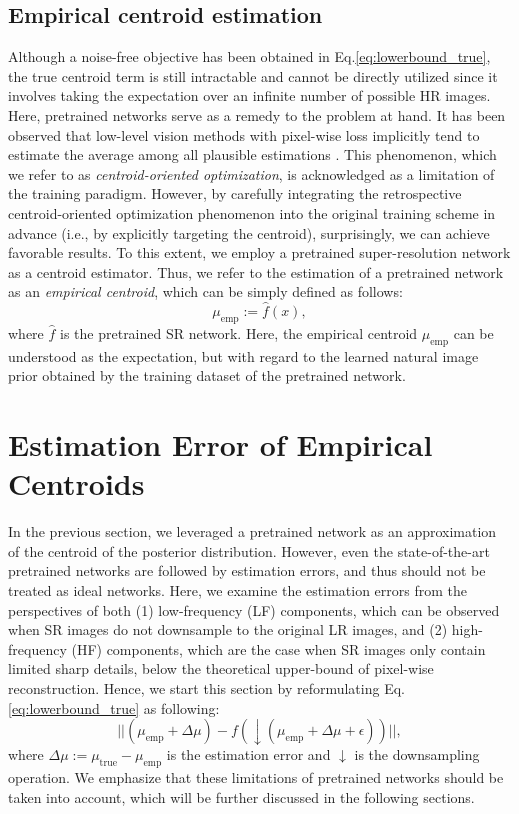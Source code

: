\documentclass[letterpaper]{article} %
\begin{document}
\subsection{Empirical centroid estimation}
Although a noise-free objective has been obtained in Eq.\eqref{eq:lowerbound_true}, the true centroid term is still intractable and cannot be directly utilized since it involves taking the expectation over an infinite number of possible HR images.
%
Here, pretrained networks serve as a remedy to the problem at hand. It has been observed that low-level vision methods with pixel-wise loss implicitly tend to estimate the average among all plausible estimations \cite{coo_1, coo_2, SISR6_SRGAN, SISR7_ESRGAN} . This phenomenon, which we refer to as \textit{centroid-oriented optimization}, is acknowledged as a limitation of the training paradigm.
%
However, by carefully integrating the retrospective centroid-oriented optimization phenomenon into the original training scheme in advance (i.e., by explicitly targeting the centroid), surprisingly, we can achieve favorable results.
%
To this extent, we employ a pretrained super-resolution network as a centroid estimator. Thus, we refer to the estimation of a pretrained network as an \textit{empirical centroid}, which can be simply defined as follows:
%
\begin{equation}
    \mu_{\text{emp}} := \hat{f}(x),
\end{equation}
%
where $\hat{f}$ is the pretrained SR network.
%
Here, the empirical centroid $\mu_{\text{emp}}$ can be understood as the expectation, but with regard to the learned natural image prior obtained by the training dataset of the pretrained network.





\section{Estimation Error of Empirical Centroids}

In the previous section, we leveraged a pretrained network as an approximation of the centroid of the posterior distribution. However, even the state-of-the-art pretrained networks are followed by estimation errors, and thus should not be treated as ideal networks.
%
Here, we examine the estimation errors from the perspectives of both (1) low-frequency (LF) components, which can be observed when SR images do not downsample to the original LR images, and (2) high-frequency (HF) components, which are the case when SR images only contain limited sharp details, below the theoretical upper-bound of pixel-wise reconstruction. Hence, we start this section by reformulating Eq.\eqref{eq:lowerbound_true} as following:
%
\begin{equation}
    \label{eq:lowerbound_with_estimationerror}
    ||(\mu_{\text{emp}} + \Delta\mu) - f(\downarrow(\mu_{\text{emp}} + \Delta\mu + \epsilon))||,
\end{equation}
%
where $\Delta\mu:=\mu_{\text{true}}-\mu_{\text{emp}}$ is the estimation error and $\downarrow$ is the downsampling operation.
We emphasize that these limitations of pretrained networks should be taken into account, which will be further discussed in the following sections.
\end{document}
